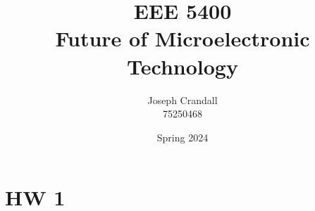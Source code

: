 
\usepackage{algorithm, algpseudocode, bm, color, gensymb, listings, siunitx, soul, subfiles, verbatim}
\usepackage[a4paper, total={7.5in, 10in}]{geometry}

\title{EEE 5400 \\ Future of Microelectronic Technology}
\author{Joseph Crandall \\ 75250468}
\date{Spring 2024}


\maketitle

\section{HW 1}


\begin{comment}

\section{HW 2}


\section{Hw 3}




\end{comment}


